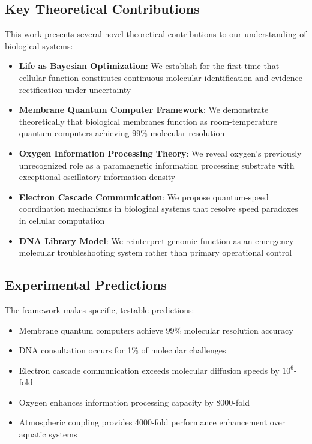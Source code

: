 \documentclass[12pt,a4paper]{article}
\begin{document}
\subsection{Key Theoretical Contributions}

This work presents several novel theoretical contributions to our understanding of biological systems:

\begin{itemize}
\item \textbf{Life as Bayesian Optimization}: We establish for the first time that cellular function constitutes continuous molecular identification and evidence rectification under uncertainty
\item \textbf{Membrane Quantum Computer Framework}: We demonstrate theoretically that biological membranes function as room-temperature quantum computers achieving 99\% molecular resolution
\item \textbf{Oxygen Information Processing Theory}: We reveal oxygen's previously unrecognized role as a paramagnetic information processing substrate with exceptional oscillatory information density
\item \textbf{Electron Cascade Communication}: We propose quantum-speed coordination mechanisms in biological systems that resolve speed paradoxes in cellular computation
\item \textbf{DNA Library Model}: We reinterpret genomic function as an emergency molecular troubleshooting system rather than primary operational control
\end{itemize}

\subsection{Experimental Predictions}

The framework makes specific, testable predictions:
\begin{itemize}
\item Membrane quantum computers achieve 99\% molecular resolution accuracy
\item DNA consultation occurs for 1\% of molecular challenges
\item Electron cascade communication exceeds molecular diffusion speeds by $10^6$-fold
\item Oxygen enhances information processing capacity by 8000-fold
\item Atmospheric coupling provides 4000-fold performance enhancement over aquatic systems
\end{itemize}
\end{document}
